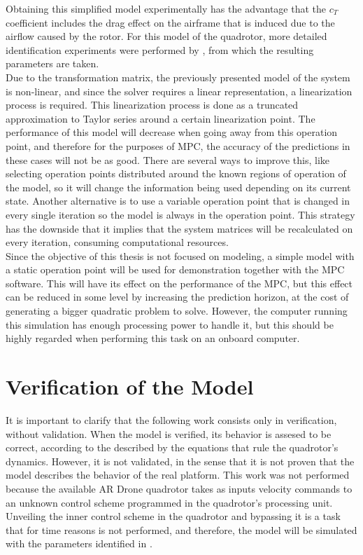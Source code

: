 Obtaining this simplified model experimentally has the advantage that the $c_T$ coefficient includes the drag effect on the airframe that is induced due to the airflow caused by the rotor. For this model of the quadrotor, more detailed identification experiments were performed by \cite{YueSun2012}, from which the resulting parameters are taken. \\

Due to the transformation matrix, the previously presented model of the system is non-linear, and since the solver requires a linear representation, a linearization process is required. This linearization process is done as a truncated approximation to Taylor series around a certain linearization point. The performance of this model will decrease when going away from this operation point, and therefore for the purposes of MPC, the accuracy of the predictions in these cases will not be as good. There are several ways to improve this, like selecting operation points distributed around the known regions of operation of the model, so it will change the information being used depending on its current state. Another alternative is to use a variable operation point that is changed in every single iteration so the model is always in the operation point. This strategy has the downside that it implies that the system matrices will be recalculated on every iteration, consuming computational resources.\\

Since the objective of this thesis is not focused on modeling, a simple model with a static operation point will be used for demonstration together with the MPC software. This will have its effect on the performance of the MPC, but this effect can be reduced in some level by increasing the prediction horizon, at the cost of generating a bigger quadratic problem to solve. However, the computer running this simulation has enough processing power to handle it, but this should be highly regarded when performing this task on an onboard computer.


\section{Verification of the Model}


It is important to clarify that the following work consists only in verification, without validation. When the model is verified, its behavior is assesed to be correct, according to the described by the equations that rule the quadrotor's dynamics. However, it is not validated, in the sense that it is not proven that the model describes the behavior of the real platform. This work was not performed because the available AR Drone quadrotor takes as inputs velocity commands to an unknown control scheme programmed in the quadrotor's processing unit. Unveiling the inner control scheme in the quadrotor and bypassing it is a task that for time reasons is not performed, and therefore, the model will be simulated with the parameters identified in \cite{YueSun2012}. \\

